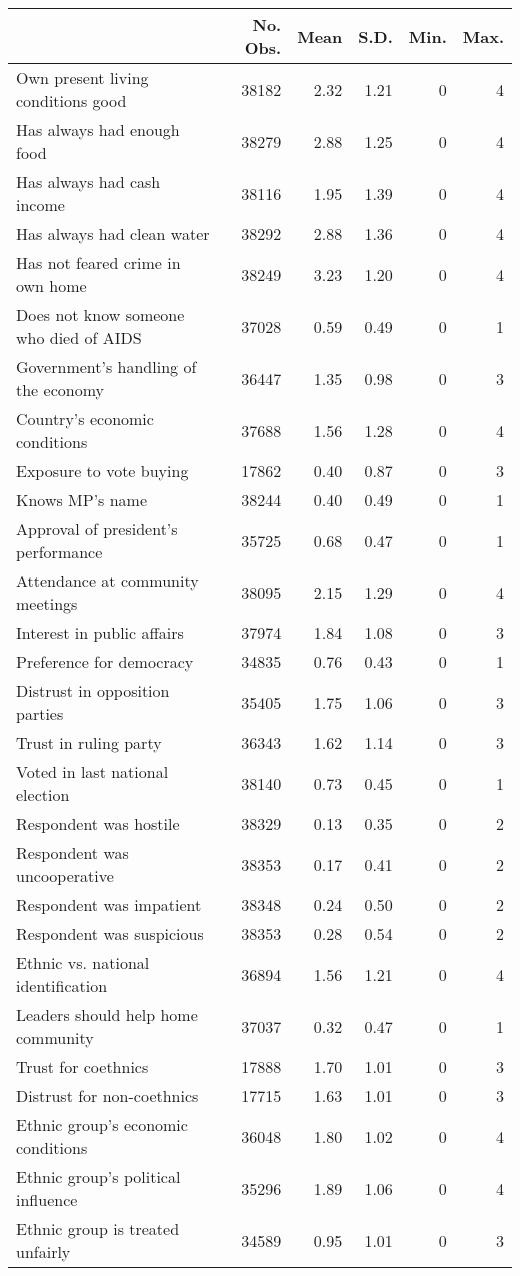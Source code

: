 \begingroup\fontsize{15}{17}\selectfont

\begin{tabular}{l|r|r|r|r|r}
\hline
  & No. Obs. & Mean & S.D. & Min. & Max.\\
\hline
Own present living conditions good & 38182 & 2.32 & 1.21 & 0 & 4\\
\hline
Has always had enough food & 38279 & 2.88 & 1.25 & 0 & 4\\
\hline
Has always had cash income & 38116 & 1.95 & 1.39 & 0 & 4\\
\hline
Has always had clean water & 38292 & 2.88 & 1.36 & 0 & 4\\
\hline
Has not feared crime in own home & 38249 & 3.23 & 1.20 & 0 & 4\\
\hline
Does not know someone who died of AIDS & 37028 & 0.59 & 0.49 & 0 & 1\\
\hline
Government's handling of the economy & 36447 & 1.35 & 0.98 & 0 & 3\\
\hline
Country's economic conditions & 37688 & 1.56 & 1.28 & 0 & 4\\
\hline
\hline
Exposure to vote buying & 17862 & 0.40 & 0.87 & 0 & 3\\
\hline
Knows MP's name & 38244 & 0.40 & 0.49 & 0 & 1\\
\hline
Approval of president's performance & 35725 & 0.68 & 0.47 & 0 & 1\\
\hline
Attendance at community meetings & 38095 & 2.15 & 1.29 & 0 & 4\\
\hline
Interest in public affairs & 37974 & 1.84 & 1.08 & 0 & 3\\
\hline
Preference for democracy & 34835 & 0.76 & 0.43 & 0 & 1\\
\hline
Distrust in opposition parties & 35405 & 1.75 & 1.06 & 0 & 3\\
\hline
Trust in ruling party & 36343 & 1.62 & 1.14 & 0 & 3\\
\hline
Voted in last national election & 38140 & 0.73 & 0.45 & 0 & 1\\
\hline
\hline
Respondent was hostile & 38329 & 0.13 & 0.35 & 0 & 2\\
\hline
Respondent was uncooperative & 38353 & 0.17 & 0.41 & 0 & 2\\
\hline
Respondent was impatient & 38348 & 0.24 & 0.50 & 0 & 2\\
\hline
Respondent was suspicious & 38353 & 0.28 & 0.54 & 0 & 2\\
\hline
\hline
Ethnic vs. national identification & 36894 & 1.56 & 1.21 & 0 & 4\\
\hline
Leaders should help home community & 37037 & 0.32 & 0.47 & 0 & 1\\
\hline
Trust for coethnics & 17888 & 1.70 & 1.01 & 0 & 3\\
\hline
Distrust for non-coethnics & 17715 & 1.63 & 1.01 & 0 & 3\\
\hline
Ethnic group's economic conditions & 36048 & 1.80 & 1.02 & 0 & 4\\
\hline
Ethnic group's political influence & 35296 & 1.89 & 1.06 & 0 & 4\\
\hline
Ethnic group is treated unfairly & 34589 & 0.95 & 1.01 & 0 & 3\\
\hline
\end{tabular}
\endgroup{}
